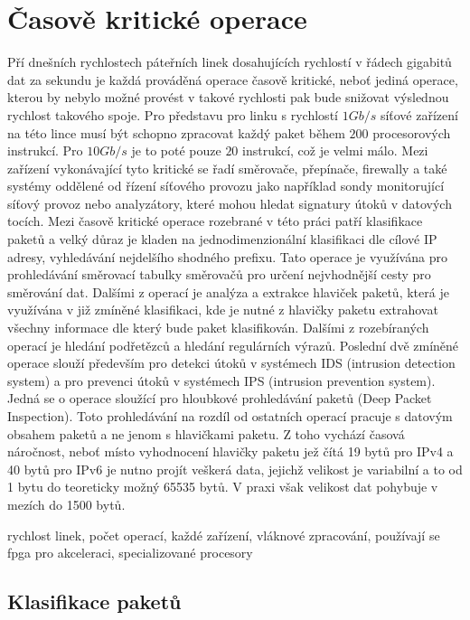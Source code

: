\section{Časově kritické operace} %
Pří dnešních rychlostech páteřních linek dosahujících rychlostí v řádech gigabitů dat za sekundu
je každá prováděná operace časově kritické, neboť jediná operace, kterou by nebylo možné
provést v takové rychlosti pak bude snižovat výslednou rychlost takového spoje.
Pro představu pro linku s rychlostí $1Gb/s$ síťové zařízení na této lince
musí být schopno zpracovat každý paket během $200$ \cite{gigabit-networking} procesorových instrukcí.
Pro $10Gb/s$ je to poté pouze $20$ instrukcí, což je velmi málo.
Mezi zařízení vykonávající tyto kritické se řadí směrovače, přepínače, firewally a také systémy
oddělené od řízení síťového provozu jako například sondy monitorující síťový provoz
nebo analyzátory, které mohou hledat signatury útoků v datových tocích.
Mezi časově kritické operace rozebrané v této práci patří klasifikace paketů a velký důraz je kladen na
jednodimenzionální klasifikaci dle cílové IP adresy, vyhledávání nejdelšího shodného prefixu.
Tato operace je využívána pro prohledávání směrovací tabulky směrovačů pro určení nejvhodnější cesty pro
směrování dat.
Dalšími z operací je analýza a extrakce hlaviček paketů, která je využívána v již zmíněné klasifikaci,
kde je nutné z hlavičky paketu extrahovat všechny informace dle který bude paket klasifikován.
Dalšími z rozebíraných operací je hledání podřetězců a hledání regulárních výrazů.
Poslední dvě zmíněné operace slouží především pro detekci útoků v systémech IDS (intrusion detection system)
a pro prevenci útoků v systémech IPS (intrusion prevention system). Jedná se o operace sloužící
pro hloubkové prohledávání paketů (Deep Packet Inspection). Toto prohledávání na rozdíl od ostatních operací
pracuje s datovým obsahem paketů a ne jenom s hlavičkami paketu. Z toho vychází časová náročnost,
neboť místo vyhodnocení hlavičky paketu jež čítá 19 bytů pro IPv4 a 40 bytů pro IPv6 je nutno
projít veškerá data, jejichž velikost je variabilní a to od 1 bytu do teoreticky možný 65535 bytů.
V praxi však velikost dat pohybuje v mezích do 1500 bytů.

rychlost linek, počet operací, každé zařízení, vláknové zpracování, používají se fpga pro akceleraci,
specializované procesory

\subsection{Klasifikace paketů}

